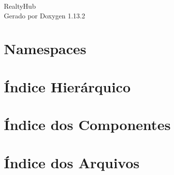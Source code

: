 \documentclass[twoside]{book}
\newcommand{\+}{\discretionary{\mbox{\scriptsize$\hookleftarrow$}}{}{}}
\newcommand{\clearemptydoublepage}{%
    \newpage{\pagestyle{empty}\cleardoublepage}%
  }
\begin{document}
  \raggedbottom
    \hypersetup{pageanchor=false,
                bookmarksnumbered=true,
                pdfencoding=unicode
               }
  \begin{titlepage}
  \vspace*{7cm}
  \begin{center}%
  {\Large Realty\+Hub}\\
  \vspace*{1cm}
  {\large Gerado por Doxygen 1.13.2}\\
  \end{center}
  \end{titlepage}
  \clearemptydoublepage
  \tableofcontents
  \clearemptydoublepage
  \hypersetup{pageanchor=true}



\chapter{Namespaces}

\chapter{Índice Hierárquico}

\chapter{Índice dos Componentes}

\chapter{Índice dos Arquivos}

\end{document}
